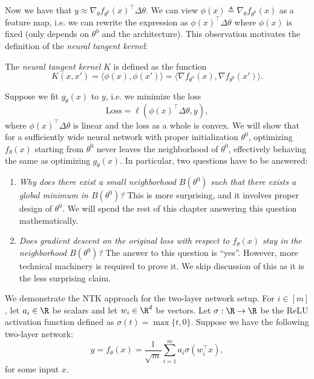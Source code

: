 Now we have that $y \approx \nabla_\theta f_{\theta^0}(x)^\top \Delta \theta$. We can view $\phi(x) \triangleq \nabla_\theta f_{\theta^0}(x)$ as a feature map, i.e. we can rewrite the expression as $\phi(x)^\top \Delta \theta$ where $\phi(x)$ is fixed (only depends on $\theta^0$ and the architecture). This observation motivates the definition of the \textit{neural tangent kernel}:

\begin{definition}
The \emph{neural tangent kernel} $K$ is defined as the function
\begin{equation}
K(x, x') = \langle \phi(x), \phi(x')\rangle = \langle \nabla f_{\theta^0}(x), \nabla f_{\theta^0}(x') \rangle.
\end{equation}
\end{definition}

Suppose we fit $g_\theta(x)$ to $y$, i.e. we minimize the loss 
\begin{equation}
\textrm{Loss} = \ell(\phi(x)^\top \Delta \theta, y),
\end{equation}
where $\phi(x)^\top\Delta \theta$ is linear and the loss as a whole is convex.
We will show that for a sufficiently wide neural network with proper initialization $\theta^0$, optimizing $f_\theta(x)$ starting from $\theta^0$ never leaves the neighborhood of $\theta^0$, effectively behaving the same as optimizing $g_\theta(x)$. In particular, two questions have to be answered:

\begin{enumerate}
    \item \textit{Why does there exist a small neighborhood $B(\theta^0)$ such that there exists a global minimum in $B(\theta^0)$?} This is more surprising, and it involves proper design of $\theta^0$. We will spend the rest of this chapter answering this question mathematically.
    \item \textit{Does gradient descent on the original loss with respect to $f_\theta(x)$ stay in the neighborhood $B(\theta^0)$?} The answer to this question is ``yes''. However, more technical machinery is required to prove it. We skip discussion of this as it is the less surprising claim.
\end{enumerate}


We demonstrate the NTK approach for the two-layer network setup. For $i \in [m]$, let $a_i \in \R$ be scalars and let $w_i \in \R^d$ be vectors. Let $\sigma: \R \to \R$ be the ReLU activation function defined as $\sigma(t) = \max\{ t, 0\}$. Suppose we have the following two-layer network:
\begin{equation}\label{lec12:eqn:network}
\hat{y} = f_\theta(x) = \frac{1}{\sqrt{m}} \sum_{i=1}^m a_i \sigma (w_i^\top x),
\end{equation}
for some input $x$.

